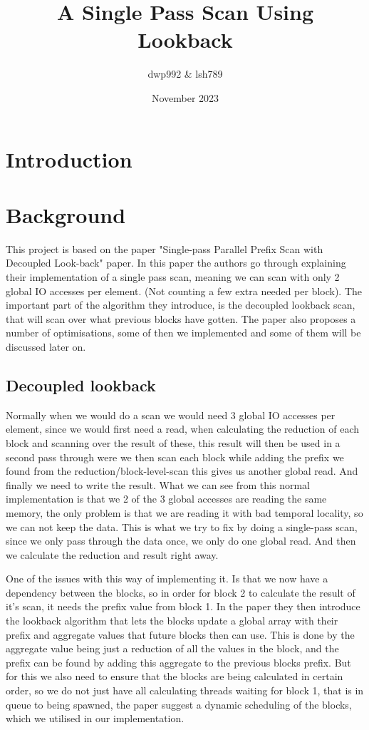 \documentclass[twocolumn]{article}
\title{A Single Pass Scan Using Lookback}
\author{dwp992 \& lsh789}
\date{November 2023\vspace{2ex}}
\begin{document}
\maketitle
\thispagestyle{fancy}

\section{Introduction}

\section{Background}
\label{sec:background}

This project is based on the paper "Single-pass Parallel Prefix Scan with Decoupled Look-back" paper. %
In this paper the authors go through explaining their implementation of a single pass scan, meaning we can scan with only 2 global IO accesses per element. (Not counting a few extra needed per block). The important part of the algorithm they introduce, is the decoupled lookback scan, that will scan over what previous blocks have gotten. The paper also proposes a number of optimisations, some of then we implemented and some of them will be discussed later on.

\subsection{Decoupled lookback}

Normally when we would do a scan we would need 3 global IO accesses per element, since we would first need a read, when calculating the reduction of each block and scanning over the result of these, this result will then be used in a second pass through were we then scan each block while adding the prefix we found from the reduction/block-level-scan this gives us another global read. And finally we need to write the result. What we can see from this normal implementation is that we 2 of the 3 global accesses are reading the same memory, the only problem is that we are reading it with bad temporal locality, so we can not keep the data. This is what we try to fix by doing a single-pass scan, since we only pass through the data once, we only do one global read. And then we calculate the reduction and result right away.

One of the issues with this way of implementing it. Is that we now have a dependency between the blocks, so in order for block 2 to calculate the result of it's scan, it needs the prefix value from block 1. In the paper they then introduce the lookback algorithm that lets the blocks update a global array with their prefix and aggregate values that future blocks then can use. This is done by the aggregate value being just a reduction of all the values in the block, and the prefix can be found by adding this aggregate to the previous blocks prefix. But for this we also need to ensure that the blocks are being calculated in certain order, so we do not just have all calculating threads waiting for block 1, that is in queue to being spawned, the paper suggest a dynamic scheduling of the blocks, which we utilised in our implementation.
\end{document}
